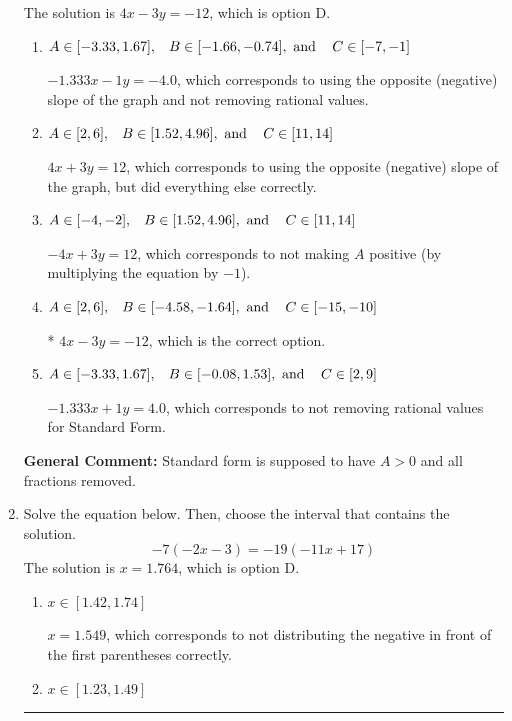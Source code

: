 \documentclass{extbook}[14pt]
\newcommand{\litem}[1]{\item #1

\rule{\textwidth}{0.4pt}}
\begin{document}
\begin{enumerate}
{The solution is \( 4x - 3y = -12 \), which is option D.\begin{enumerate}[label=\Alph*.]
\item \( A \in [-3.33, 1.67], \hspace{3mm} B \in [-1.66, -0.74], \text{ and } \hspace{3mm} C \in [-7, -1] \)

 $-1.333x - 1y = -4.0$, which corresponds to using the opposite (negative) slope of the graph and not removing rational values.
\item \( A \in [2, 6], \hspace{3mm} B \in [1.52, 4.96], \text{ and } \hspace{3mm} C \in [11, 14] \)

 $4x + 3y = 12$, which corresponds to using the opposite (negative) slope of the graph, but did everything else correctly.
\item \( A \in [-4, -2], \hspace{3mm} B \in [1.52, 4.96], \text{ and } \hspace{3mm} C \in [11, 14] \)

 $-4x + 3y = 12$, which corresponds to not making $A$ positive (by multiplying the equation by $-1$).
\item \( A \in [2, 6], \hspace{3mm} B \in [-4.58, -1.64], \text{ and } \hspace{3mm} C \in [-15, -10] \)

* $4x - 3y = -12$, which is the correct option.
\item \( A \in [-3.33, 1.67], \hspace{3mm} B \in [-0.08, 1.53], \text{ and } \hspace{3mm} C \in [2, 9] \)

 $-1.333x + 1y = 4.0$, which corresponds to not removing rational values for Standard Form.
\end{enumerate}

\textbf{General Comment:} Standard form is supposed to have $A > 0$ and all fractions removed.
}
\litem{
Solve the equation below. Then, choose the interval that contains the solution.
\[ -7(-2x -3) = -19(-11x + 17) \]The solution is \( x = 1.764 \), which is option D.\begin{enumerate}[label=\Alph*.]
\item \( x \in [1.42, 1.74] \)

$x = 1.549$, which corresponds to not distributing the negative in front of the first parentheses correctly.
\item \( x \in [1.23, 1.49] \)


\end{enumerate}}
\end{enumerate}
\end{document}
